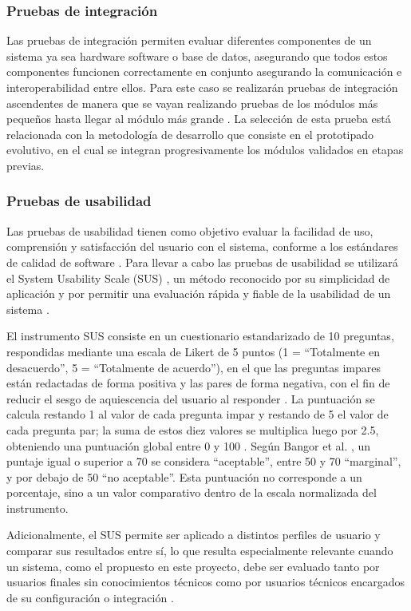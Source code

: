 \documentclass{iccmemoria}
\begin{document}
\subsubsection{Pruebas de integración}
Las pruebas de integración permiten evaluar diferentes componentes de un sistema  
ya sea hardware software o base de datos, asegurando que todos estos componentes 
funcionen correctamente en conjunto asegurando la comunicación e interoperabilidad 
entre ellos. Para este caso se realizarán pruebas de integración ascendentes de manera que 
se vayan realizando pruebas de los módulos más pequeños hasta llegar al módulo más 
grande \cite{ibm_integrationtesting}. La selección de esta prueba está relacionada con la metodología de desarrollo que consiste en el prototipado evolutivo, en el cual se integran progresivamente los módulos validados en etapas previas.

\subsubsection{Pruebas de usabilidad}
Las pruebas de usabilidad tienen como objetivo evaluar la facilidad de uso, comprensión y satisfacción del usuario con el sistema, conforme a los estándares de calidad de software \cite{iso9241} \cite{nielsen1993}. Para llevar a cabo las pruebas de usabilidad se utilizará el System Usability Scale (SUS) \cite{brooke1996}, un método reconocido por su simplicidad de aplicación y por permitir una evaluación rápida y fiable de la usabilidad de un sistema \cite{bangor2008}.

El instrumento SUS consiste en un cuestionario estandarizado de 10 preguntas, respondidas mediante una escala de Likert de 5 puntos (1 = ``Totalmente en desacuerdo'', 5 = ``Totalmente de acuerdo''), en el que las preguntas impares están redactadas de forma positiva y las pares de forma negativa, con el fin de reducir el sesgo de aquiescencia del usuario al responder \cite{brooke1996}. La puntuación se calcula restando 1 al valor de cada pregunta impar y restando de 5 el valor de cada pregunta par; la suma de estos diez valores se multiplica luego por 2.5, obteniendo una puntuación global entre 0 y 100 \cite{brooke1996}. Según Bangor et al. \cite{bangor2008}, un puntaje igual o superior a 70 se considera ``aceptable'', entre 50 y 70 ``marginal'', y por debajo de 50 ``no aceptable''. Esta puntuación no corresponde a un porcentaje, sino a un valor comparativo dentro de la escala normalizada del instrumento.

Adicionalmente, el SUS permite ser aplicado a distintos perfiles de usuario y comparar sus resultados entre sí, lo que resulta especialmente relevante cuando un sistema, como el propuesto en este proyecto, debe ser evaluado tanto por usuarios finales sin conocimientos técnicos como por usuarios técnicos encargados de su configuración o integración \cite{bangor2008}.
\end{document}

